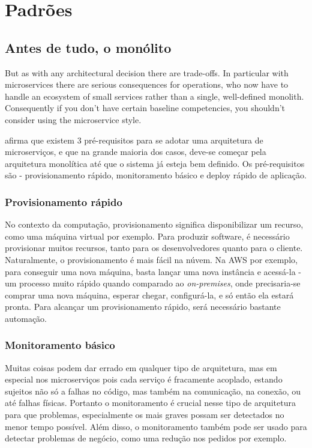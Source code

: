 \chapter{Padrões}\label{chapter-padroes}

\section{Antes de tudo, o monólito}

\begin{citacao}
But as with any architectural decision there are trade-offs. In particular with microservices there are serious consequences for operations, who now have to handle an ecosystem of small services rather than a single, well-defined monolith. Consequently if you don't have certain baseline competencies, you shouldn't consider using the microservice style. \cite{MartinFowlerMicroservices}
\end{citacao}

 afirma que existem 3 pré-requisitos para se adotar uma arquitetura de microserviços, e que na grande maioria dos casos, deve-se começar pela arquitetura monolítica até que o sistema já esteja bem definido. Os pré-requisitos são - provisionamento rápido, monitoramento básico e deploy rápido de aplicação.

\subsection{Provisionamento rápido}

No contexto da computação, provisionamento significa disponibilizar um recurso, como uma máquina virtual por exemplo. Para produzir software, é necessário provisionar muitos recursos, tanto para os desenvolvedores quanto para o cliente. Naturalmente, o provisionamento é mais fácil na núvem. Na AWS por exemplo, para conseguir uma nova máquina, basta lançar uma nova instância e acessá-la - um processo muito rápido quando comparado ao \emph{on-premises}, onde precisaria-se comprar uma nova máquina, esperar chegar, configurá-la, e só então ela estará pronta. Para alcançar um provisionamento rápido, será necessário bastante automação.

\subsection{Monitoramento básico}

Muitas coisas podem dar errado em qualquer tipo de arquitetura, mas em especial nos microserviços pois cada serviço é fracamente acoplado, estando sujeitos não só a falhas no código, mas também na comunicação, na conexão, ou até falhas físicas. Portanto o monitoramento é crucial nesse tipo de arquitetura para que problemas, especialmente os mais graves possam ser detectados no menor tempo possível. Além disso, o monitoramento também pode ser usado para detectar problemas de negócio, como uma redução nos pedidos por exemplo.

